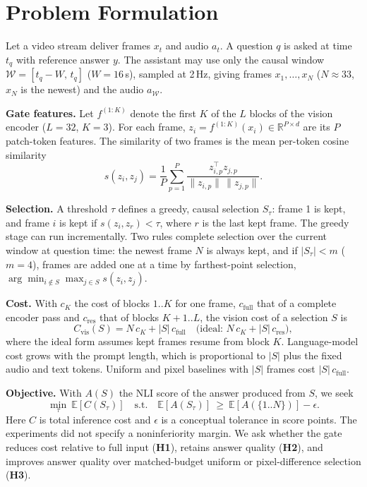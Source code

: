 \documentclass[conference]{IEEEtran}
\begin{document}
\section{Problem Formulation}\label{sec:formulation}
Let a video stream deliver frames $x_t$ and audio $a_t$. A question $q$ is asked at time $t_q$ with reference answer $y$. The assistant may use only the causal window $\mathcal{W}=[t_q-W,\,t_q]$ ($W{=}16$\,s), sampled at 2\,Hz, giving frames $x_1,\dots,x_N$ ($N\approx33$, $x_N$ is the newest) and the audio $a_{\mathcal{W}}$.

\textbf{Gate features.} Let $f^{(1:K)}$ denote the first $K$ of the $L$ blocks of the vision encoder ($L{=}32$, $K{=}3$). For each frame, $z_i=f^{(1:K)}(x_i)\in\mathbb{R}^{P\times d}$ are its $P$ patch-token features. The similarity of two frames is the mean per-token cosine similarity
\begin{equation}
s(z_i,z_j)=\frac{1}{P}\sum_{p=1}^{P}\frac{z_{i,p}^{\top}z_{j,p}}{\lVert z_{i,p}\rVert\,\lVert z_{j,p}\rVert}.
\end{equation}

\textbf{Selection.} A threshold $\tau$ defines a greedy, causal selection $S_\tau$: frame 1 is kept, and frame $i$ is kept if $s(z_i,z_{r})<\tau$, where $r$ is the last kept frame. The greedy stage can run incrementally. Two rules complete selection over the current window at question time: the newest frame $N$ is always kept, and if $|S_\tau|<m$ ($m{=}4$), frames are added one at a time by farthest-point selection, $\arg\min_{i\notin S}\max_{j\in S}s(z_i,z_j)$.

\textbf{Cost.} With $c_K$ the cost of blocks $1..K$ for one frame, $c_{\text{full}}$ that of a complete encoder pass and $c_{\text{res}}$ that of blocks $K{+}1..L$, the vision cost of a selection $S$ is
\begin{equation}\label{eq:cost}
C_{\text{vis}}(S)=N\,c_K+|S|\,c_{\text{full}}\quad\text{(ideal: } N\,c_K+|S|\,c_{\text{res}}),
\end{equation}
where the ideal form assumes kept frames resume from block $K$. Language-model cost grows with the prompt length, which is proportional to $|S|$ plus the fixed audio and text tokens. Uniform and pixel baselines with $|S|$ frames cost $|S|\,c_{\text{full}}$.

\textbf{Objective.} With $A(S)$ the NLI score of the answer produced from $S$, we seek
\begin{equation}
\min_{\tau}\ \mathbb{E}[C(S_\tau)]\quad\text{s.t.}\quad \mathbb{E}[A(S_\tau)]\ \ge\ \mathbb{E}[A(\{1..N\})]-\epsilon.
\end{equation}
Here $C$ is total inference cost and $\epsilon$ is a conceptual tolerance in score points. The experiments did not specify a noninferiority margin. We ask whether the gate reduces cost relative to full input (\textbf{H1}), retains answer quality (\textbf{H2}), and improves answer quality over matched-budget uniform or pixel-difference selection (\textbf{H3}).
\end{document}
